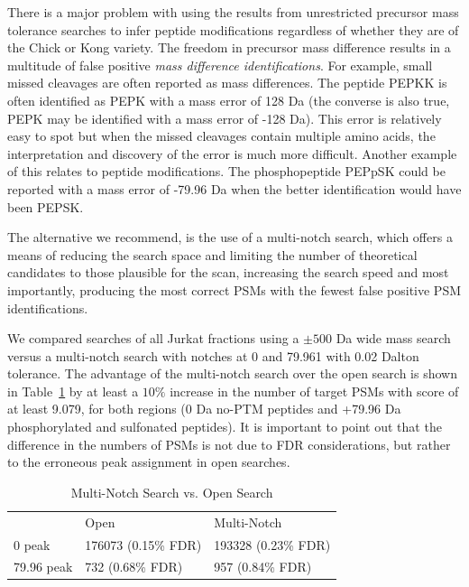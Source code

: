 \documentclass[journal=jprobs,manuscript=article]{achemso}
\begin{document}
There is a major problem with using the results from unrestricted precursor mass tolerance searches to infer peptide modifications regardless of whether they are of the Chick or Kong variety.
The freedom in precursor mass difference results in a multitude of false positive \textit{mass difference identifications}.
For example, small missed cleavages are often reported as mass differences.
The peptide PEPKK is often identified as PEPK with a mass error of 128 Da (the converse is also true, PEPK may be identified with a mass error of -128 Da).
This error is relatively easy to spot but when the missed cleavages contain multiple amino acids, the interpretation and discovery of the error is much more difficult.
Another example of this relates to peptide modifications.
The phosphopeptide PEPpSK could be reported with a mass error of -79.96 Da when the better identification would have been PEPSK.

The alternative we recommend, is the use of a multi-notch search, which offers a means of reducing the search space and limiting the number of theoretical candidates to those plausible for the scan, increasing the search speed and most importantly, producing the most correct PSMs with the fewest false positive PSM identifications.

We compared searches of all Jurkat fractions using a $\pm 500$ Da wide mass search versus a multi-notch search with notches at 0 and 79.961 with 0.02 Dalton tolerance.
The advantage of the multi-notch search over the open search is shown in Table~\ref{tbl:multiVsWide} by at least a $10\%$ increase in the number of target PSMs with score of at least 9.079, for both regions (0 Da no-PTM peptides and +79.96 Da phosphorylated and sulfonated peptides).
It is important to point out that the difference in the numbers of PSMs is not due to FDR considerations, but rather to the erroneous peak assignment in open searches.

\begin{table}[]
\centering
\caption{Multi-Notch Search vs. Open Search}
\label{tbl:multiVsWide}
\begin{tabular}{lll}
                    & Open & Multi-Notch\\
0 peak    & 176073  (0.15\% FDR)     & 193328 (0.23\% FDR)     \\
79.96 peak     & 732   (0.68\% FDR)   & 957  (0.84\% FDR)           \\
\end{tabular}
\end{table}
\end{document}
